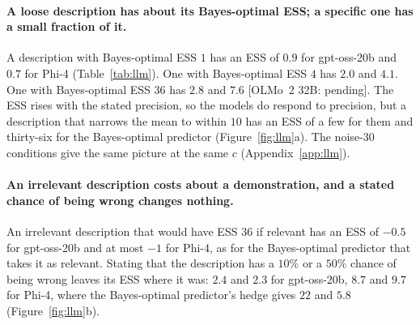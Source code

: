 \documentclass{article}
\begin{document}
\begin{table}[t]
\centering\small
\setlength{\tabcolsep}{2.4pt}
\caption{\textbf{The models rely on the stated value by a fixed amount, so a loose description has about its Bayes-optimal ESS and a specific one a small fraction of it.} Left: ESS of a description for each model against its Bayes-optimal ESS, the median over $n = 1$, $2$, and $4$ demonstrations shown ($\sigma = 60$, $2{,}000$ tasks; brackets, $95\%$ bootstrap intervals; negative: the description costs that many demonstrations; $\le$: one demonstration alone beats the description, so the ESS is at most the value shown), for a relevant description with Bayes-optimal ESS $1$, $4$, or $36$, an irrelevant one that would have ESS $36$, and the description with ESS $36$ with a stated $10\%$ or $50\%$ chance of being wrong. Right: the weight on the stated value with one demonstration shown, for the three relevant descriptions; the Bayes-optimal weight is $c/(c+n)$. The Bayes-optimal row knows only what the prompt says, takes a description as relevant unless a reliability is stated, and then hedges with that $p$.}
\label{tab:llm}
\vspace{3pt}

\end{table}

\paragraph{A loose description has about its Bayes-optimal ESS; a specific one has a small fraction of it.} A description with Bayes-optimal ESS $1$ has an ESS of $0.9$ for gpt-oss-20b and $0.7$ for Phi-4 (Table~\ref{tab:llm}). One with Bayes-optimal ESS $4$ has $2.0$ and $4.1$. One with Bayes-optimal ESS $36$ has $2.8$ and $7.6$ [OLMo~2 32B: pending]. The ESS rises with the stated precision, so the models do respond to precision, but a description that narrows the mean to within $10$ has an ESS of a few for them and thirty-six for the Bayes-optimal predictor (Figure~\ref{fig:llm}a). The noise-$30$ conditions give the same picture at the same $c$ (Appendix~\ref{app:llm}).

\paragraph{An irrelevant description costs about a demonstration, and a stated chance of being wrong changes nothing.} An irrelevant description that would have ESS $36$ if relevant has an ESS of $-0.5$ for gpt-oss-20b and at most $-1$ for Phi-4, as for the Bayes-optimal predictor that takes it as relevant. Stating that the description has a $10\%$ or a $50\%$ chance of being wrong leaves its ESS where it was: $2.4$ and $2.3$ for gpt-oss-20b, $8.7$ and $9.7$ for Phi-4, where the Bayes-optimal predictor's hedge gives $22$ and $5.8$ (Figure~\ref{fig:llm}b).
\end{document}
